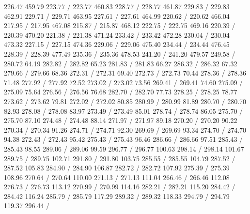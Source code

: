 { 226.47 459.79 223.77 /
 223.77 460.83 228.77 /
 228.77 461.87 229.83 /
 229.83 462.91 229.71 /
 229.71 463.95 227.61 /
 227.61 464.99 220.62 /
 220.62 466.04 217.95 /
 217.95 467.08 215.87 /
 215.87 468.12 222.75 /
 222.75 469.16 220.39 /
 220.39 470.20 221.38 /
 221.38 471.24 233.42 /
 233.42 472.28 230.04 /
 230.04 473.32 227.15 /
 227.15 474.36 229.06 /
 229.06 475.40 234.44 /
 234.44 476.45 228.39 /
 228.39 477.49 235.36 /
 235.36 478.53 241.20 /
 241.20 479.57 249.58 /
\setsolid
{} 280.72 64.19 282.82 /
 282.82 65.23 281.83 /
 281.83 66.27 286.32 /
 286.32 67.32 279.66 /
 279.66 68.36 272.31 /
 272.31 69.40 272.73 /
 272.73 70.44 278.36 /
 278.36 71.48 277.92 /
 277.92 72.52 273.02 /
 273.02 73.56 269.41 /
 269.41 74.60 275.09 /
 275.09 75.64 276.56 /
 276.56 76.68 282.70 /
 282.70 77.73 278.25 /
 278.25 78.77 273.62 /
 273.62 79.81 272.02 /
 272.02 80.85 280.99 /
 280.99 81.89 280.70 /
 280.70 82.93 278.08 /
 278.08 83.97 273.49 /
 273.49 85.01 278.74 /
 278.74 86.05 275.70 /
 275.70 87.10 274.48 /
 274.48 88.14 271.97 /
 271.97 89.18 270.20 /
 270.20 90.22 270.34 /
 270.34 91.26 274.71 /
 274.71 92.30 269.69 /
 269.69 93.34 274.70 /
 274.70 94.38 272.43 /
 272.43 95.42 275.43 /
 275.43 96.46 286.66 /
 286.66 97.51 285.43 /
 285.43 98.55 289.06 /
 289.06 99.59 296.77 /
 296.77 100.63 298.14 /
 298.14 101.67 289.75 /
 289.75 102.71 291.80 /
 291.80 103.75 285.55 /
 285.55 104.79 287.52 /
 287.52 105.83 284.90 /
 284.90 106.87 282.72 /
 282.72 107.92 275.39 /
 275.39 108.96 270.64 /
 270.64 110.00 271.13 /
 271.13 111.04 266.46 /
 266.46 112.08 276.73 /
 276.73 113.12 270.99 /
 270.99 114.16 282.21 /
 282.21 115.20 284.42 /
 284.42 116.24 285.79 /
 285.79 117.29 289.32 /
 289.32 118.33 294.79 /
 294.79 119.37 296.44 /
}

